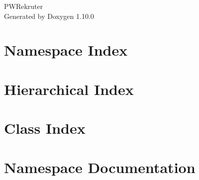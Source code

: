 \documentclass[twoside]{book}
\newcommand{\+}{\discretionary{\mbox{\scriptsize$\hookleftarrow$}}{}{}}
\newcommand{\clearemptydoublepage}{%
    \newpage{\pagestyle{empty}\cleardoublepage}%
  }
\begin{document}
  \raggedbottom
    \hypersetup{pageanchor=false,
                bookmarksnumbered=true,
                pdfencoding=unicode
               }
  \begin{titlepage}
  \vspace*{7cm}
  \begin{center}%
  {\Large PWRekruter}\\
  \vspace*{1cm}
  {\large Generated by Doxygen 1.10.0}\\
  \end{center}
  \end{titlepage}
  \clearemptydoublepage
  \tableofcontents
  \clearemptydoublepage
  \hypersetup{pageanchor=true}


\chapter{Namespace Index}

\chapter{Hierarchical Index}

\chapter{Class Index}

\chapter{Namespace Documentation}










\end{document}

